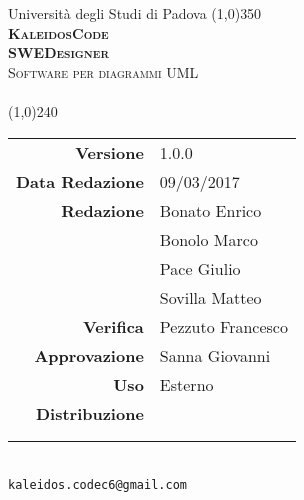\documentclass[a4paper,12pt]{article}
\author{KaleidosCode}
\date{09/03/2017}	%
\begin{document}
	\begin{titlepage}
		\centering Università degli Studi di Padova
		\line(1,0){350}\\
		\vspace{0.4cm}
		{\bfseries\scshape\LARGE KaleidosCode\\}
		\vspace{0.4cm}
		{\bfseries\scshape\LARGE SWEDesigner\\}
		{\scshape\Large Software per diagrammi UML\\}
		\vspace{1cm}
		{\scshape\Large \pianodiqualificai\ \\}		%
		\vspace{1.4cm}
		\logo
		\vspace{1.2cm}
		\line(1,0){240}\\
		\begin{tabular}{r|l}
			{\hfill \textbf{Versione}} 			& 1.0.0\\
			{\hfill \textbf{Data Redazione}} 	& 09/03/2017\\	%
			{\hfill \textbf{Redazione}} 		& Bonato Enrico\\ & Bonolo Marco\\ & Pace Giulio\\ & Sovilla Matteo\\
			{\hfill \textbf{Verifica}} 			& Pezzuto Francesco\\
			{\hfill \textbf{Approvazione}} 		& Sanna Giovanni\\
			{\hfill \textbf{Uso}} 				& Esterno\\
			{\hfill \textbf{Distribuzione}} 	& \vardanega \\ & \cardin \\ & \proponente\\
		\end{tabular}\\
		\vspace{2cm}
		\texttt{kaleidos.codec6@gmail.com}
	\end{titlepage}

	\pagestyle{myfront}
	\newpage
		
	\newpage
		\tableofcontents
	\newpage
		\listoftables
	\newpage
	\pagestyle{mymain}
		
	\newpage
		
	\newpage
		
	\newpage
		
%		
	\label{LastPage}
\end{document}
